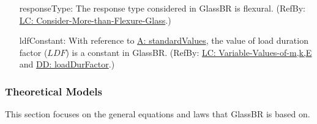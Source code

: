 \documentclass[12pt]{article}
\begin{document}
\begin{itemize}
\item[responseType:\phantomsection\label{assumpRT}]{The response type considered in GlassBR is flexural. (RefBy: \hyperref[considerMoreThanFlexGlass]{LC: Consider-More-than-Flexure-Glass}.)}
\item[ldfConstant:\phantomsection\label{assumpLDFC}]{With reference to \hyperref[assumpSV]{A: standardValues}, the value of load duration factor ($LDF$) is a constant in GlassBR. (RefBy: \hyperref[varValsOfmkE]{LC: Variable-Values-of-m,k,E} and \hyperref[DD:loadDurFactor]{DD: loadDurFactor}.)}
\end{itemize}
\subsubsection{Theoretical Models}
\label{Sec:TMs}
This section focuses on the general equations and laws that GlassBR is based on.
\end{document}
